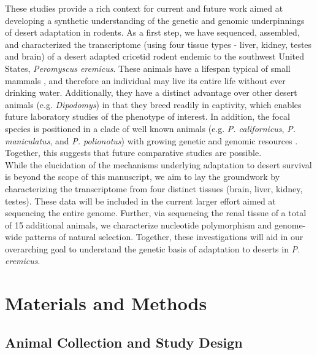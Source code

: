 \documentclass[11pt]{article}
\begin{document}
These studies provide a rich context for current and future work aimed at developing a synthetic understanding of the genetic and genomic underpinnings of desert adaptation in rodents. As a first step, we have sequenced, assembled, and characterized the transcriptome (using four tissue types - liver, kidney, testes and brain) of a desert adapted cricetid rodent endemic to the southwest United States, \textit{Peromyscus eremicus}. These animals have a lifespan typical of small mammals \cite{Veal:2001vp}, and therefore an individual may live its entire life without ever drinking water. Additionally, they have a distinct advantage over other desert animals (e.g. \textit{Dipodomys}) in that they breed readily in captivity, which enables future laboratory studies of the phenotype of interest. In addition, the focal species is positioned in a clade of well known animals (e.g. \textit{P. californicus}, \textit{P. maniculatus}, and \textit{P. polionotus}) \cite{Bradley:2007jo} with growing genetic and genomic resources \cite{Shorter:2014kw,Panhuis:2011co,Shorter:2012ib}. Together, this suggests that future comparative studies are possible. \\

While the elucidation of the mechanisms underlying adaptation to desert survival is beyond the scope of this manuscript, we aim to lay the groundwork by characterizing the transcriptome from four distinct tissues (brain, liver, kidney, testes). These data will be included in the current larger effort aimed at sequencing the entire genome. Further, via sequencing the renal tissue of a total of 15 additional animals, we characterize nucleotide polymorphism and genome-wide patterns of natural selection. Together, these investigations will aid in our overarching goal to understand the genetic basis of adaptation to deserts in \textit{P. eremicus}.

\section*{Materials and Methods}

\subsection*{Animal Collection and Study Design}
\end{document}
